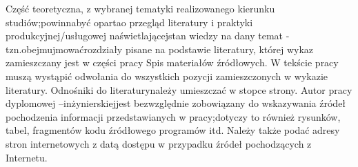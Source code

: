 Część teoretyczna, z wybranej tematyki realizowanego kierunku studiów;powinnabyć opartao przegląd literatury i praktyki produkcyjnej/usługowej naświetlającejstan wiedzy na dany temat -tzn.obejmujmowaćrozdziały pisane na podstawie literatury, której wykaz zamieszczany jest w części pracy Spis materiałów źródłowych. W tekście pracy muszą wystąpić odwołania do wszystkich pozycji zamieszczonych w wykazie literatury. Odnośniki do literaturynależy umieszczać w stopce strony. Autor pracy dyplomowej –inżynierskiejjest bezwzględnie zobowiązany do wskazywania źródeł pochodzenia informacji przedstawianych w pracy;dotyczy to również rysunków, tabel, fragmentów kodu źródłowego programów itd. Należy także podać adresy stron internetowych z datą dostępu w przypadku źródeł pochodzących z Internetu.
